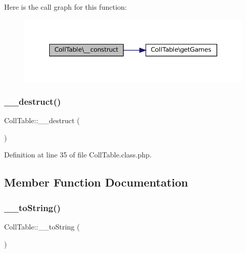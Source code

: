 Here is the call graph for this function\+:\nopagebreak
\begin{figure}[H]
\begin{center}
\leavevmode
\includegraphics[width=349pt]{class_coll_table_a349a8bdf7bf6a96ecce40e5b9cedcabf_cgraph}
\end{center}
\end{figure}
\mbox{\label{class_coll_table_aea5380abb2931c4249bc3ea392db9d7a}} 
\subsubsection{\texorpdfstring{\+\_\+\+\_\+destruct()}{\_\_destruct()}}
{\footnotesize\ttfamily Coll\+Table\+::\+\_\+\+\_\+destruct (\begin{DoxyParamCaption}{ }\end{DoxyParamCaption})}



Definition at line 35 of file Coll\+Table.\+class.\+php.



\subsection{Member Function Documentation}
\mbox{\label{class_coll_table_a2b5eaf43b8dfd15a7c152d178d9d5091}} 
\subsubsection{\texorpdfstring{\+\_\+\+\_\+to\+String()}{\_\_toString()}}
{\footnotesize\ttfamily Coll\+Table\+::\+\_\+\+\_\+to\+String (\begin{DoxyParamCaption}{ }\end{DoxyParamCaption})}



